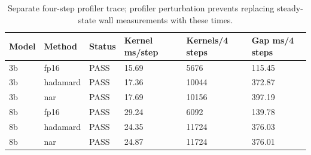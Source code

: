 \begin{table}[t]
\centering
\small
\caption{Separate four-step profiler trace; profiler perturbation prevents replacing steady-state wall measurements with these times.}
\begin{tabular}{llllll}
\toprule
Model & Method & Status & Kernel ms/step & Kernels/4 steps & Gap ms/4 steps \\
\midrule
3b & fp16 & PASS & 15.69 & 5676 & 115.45 \\
3b & hadamard & PASS & 17.36 & 10044 & 372.87 \\
3b & nar & PASS & 17.69 & 10156 & 397.19 \\
8b & fp16 & PASS & 29.24 & 6092 & 139.78 \\
8b & hadamard & PASS & 24.35 & 11724 & 376.03 \\
8b & nar & PASS & 24.87 & 11724 & 376.01 \\
\bottomrule
\end{tabular}
\end{table}
